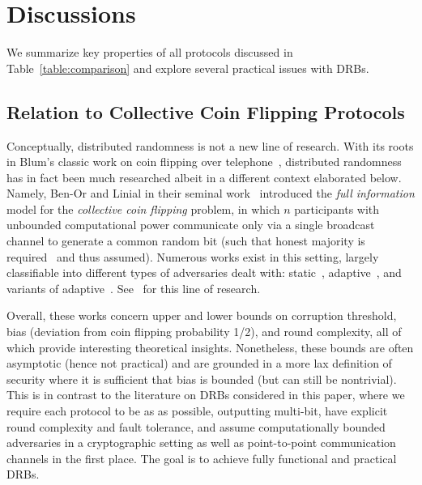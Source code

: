 \section{Discussions}
\label{section:discussions}
We summarize key properties of all protocols discussed in Table~\ref{table:comparison} and explore several practical issues with DRBs.

\subsection{Relation to Collective Coin Flipping Protocols}
Conceptually, distributed randomness is not a new line of research.
With its roots in Blum's classic work on coin flipping over telephone~\cite{blum1983coin}, distributed randomness has in fact been much researched albeit in a different context elaborated below.
Namely, Ben-Or and Linial in their seminal work~\cite{ben1985collective,ben1989collective} introduced the \textit{full information} model for the \textit{collective coin flipping} problem, in which $n$ participants with unbounded computational power communicate only via a single broadcast channel to generate a common random bit (such that honest majority is required~\cite{saks1989robust,boppana2000perfect} and thus assumed).
Numerous works exist in this setting, largely classifiable into different types of adversaries dealt with: static~\cite{ben1989collective,ajtai1993influence,kahn1989influence,saks1989robust,alon1993coin,boppana2000perfect,feige1999noncryptographic,russell1999lower}, adaptive~\cite{ben1989collective,lichtenstein1989some,goldwasser2015adaptively,dodis2000impossibility,kalai2021lower,haitner2020tight}, and variants of adaptive~\cite{mahloujifar2019can,etesami2020computational,cleve1993martingales,aspnes1998lower,goldwasser2015adaptively}.
See~\cite{kalai2021lower,haitner2020tight} for this line of research.

Overall, these works concern upper and lower bounds on corruption threshold, bias (deviation from coin flipping probability 1/2), and round complexity, all of which provide interesting theoretical insights.
Nonetheless, these bounds are often asymptotic (hence not practical) and are grounded in a more lax definition of security where it is sufficient that bias is bounded (but can still be nontrivial).
This is in contrast to the literature on DRBs considered in this paper, where we require each protocol to be as \drbsecure as possible, outputting multi-bit, have explicit round complexity and fault tolerance, and assume computationally bounded adversaries in a cryptographic setting as well as point-to-point communication channels in the first place.
The goal is to achieve fully functional and practical DRBs.

